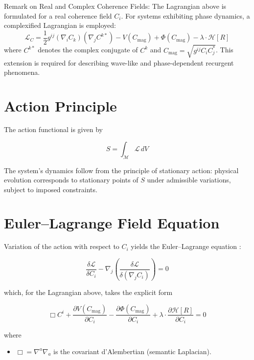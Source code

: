 Remark on Real and Complex Coherence Fields: The Lagrangian above is formulated for a real coherence field \(C_i\). For systems exhibiting phase dynamics, a complexified Lagrangian is employed:
\begin{equation}
\mathcal{L}_C = \frac{1}{2} g^{ij} (\nabla_i C_k)(\nabla_j C^{k*}) - V(C_{\mathrm{mag}}) + \Phi(C_{\mathrm{mag}}) - \lambda \cdot \mathcal{H}[R]
\end{equation}
where \(C^{k*}\) denotes the complex conjugate of \(C^k\) and \(C_{\mathrm{mag}} = \sqrt{g^{ij} C_i C_j^*}\). This extension is required for describing wave-like and phase-dependent recurgent phenomena.

\section{Action Principle}

The action functional is given by

\begin{equation}
S = \int_{\mathcal{M}} \mathcal{L} \, dV
\end{equation}

The system's dynamics follow from the principle of stationary action: physical evolution corresponds to stationary points of \(S\) under admissible variations, subject to imposed constraints.

\section{Euler–Lagrange Field Equation}

Variation of the action with respect to \(C_i\) yields the Euler–Lagrange equation \autocite{Euler1744, Lagrange1788}:

\begin{equation}
\frac{\delta \mathcal{L}}{\delta C_i} - \nabla_j \left( \frac{\delta \mathcal{L}}{\delta (\nabla_j C_i)} \right) = 0
\end{equation}

which, for the Lagrangian above, takes the explicit form

\begin{equation}
\Box C^i + \frac{\partial V(C_{\mathrm{mag}})}{\partial C_i} - \frac{\partial \Phi(C_{\mathrm{mag}})}{\partial C_i} + \lambda \cdot \frac{\partial \mathcal{H}[R]}{\partial C_i} = 0
\end{equation}

where

\begin{itemize}
    \item \(\Box = \nabla^a \nabla_a\) is the covariant d'Alembertian (semantic Laplacian).
\end{itemize}

